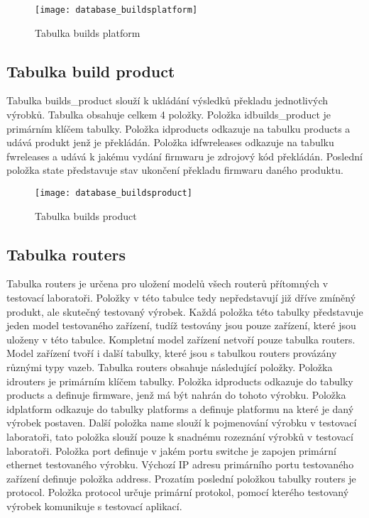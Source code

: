 \begin{figure}[h]
  \centering
  \texttt{[image: database\_buildsplatform]}
  \caption{Tabulka builds platform}
  \label{fig:database_buildsplatform}
\end{figure}

\subsection{Tabulka build product}
Tabulka builds\_product slouží k ukládání výsledků překladu jednotlivých výrobků. Tabulka obsahuje celkem 4 položky. Položka idbuilds\_product je primárním klíčem tabulky. Položka idproducts odkazuje na tabulku products a udává produkt jenž je překládán. Položka idfwreleases odkazuje na tabulku fwreleases a udává k jakému vydání firmwaru je zdrojový kód překládán. Poslední položka state představuje stav ukončení překladu firmwaru daného produktu.

\begin{figure}[h]
  \centering
  \texttt{[image: database\_buildsproduct]}
  \caption{Tabulka builds product}
  \label{fig:database_buildsproduct}
\end{figure}

\subsection{Tabulka routers}
Tabulka routers je určena pro uložení modelů všech routerů přítomných v testovací laboratoři. Položky v této tabulce tedy nepředstavují již dříve zmíněný produkt, ale skutečný testovaný výrobek. Každá položka této tabulky představuje jeden model testovaného zařízení, tudíž testovány jsou pouze zařízení, které jsou uloženy v této tabulce. Kompletní model zařízení netvoří pouze tabulka routers. Model zařízení tvoří i další tabulky, které jsou s tabulkou routers provázány různými typy vazeb. Tabulka routers obsahuje následující položky. Položka idrouters je primárním klíčem tabulky. Položka idproducts odkazuje do tabulky products a definuje firmware, jenž má být nahrán do tohoto výrobku. Položka idplatform odkazuje do tabulky platforms a definuje platformu na které je daný výrobek postaven. Další položka name slouží k pojmenování výrobku v testovací laboratoři, tato položka slouží pouze k snadnému rozeznání výrobků v testovací laboratoři. Položka port definuje v jakém portu switche je zapojen primární ethernet testovaného výrobku. Výchozí IP adresu primárního portu testovaného zařízení definuje položka address. Prozatím poslední položkou tabulky routers je protocol. Položka protocol určuje primární protokol, pomocí kterého testovaný výrobek komunikuje s testovací aplikací.

